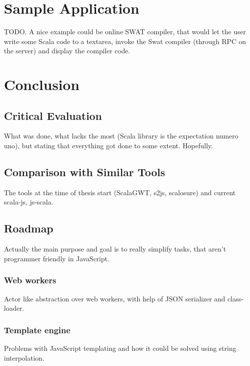 \documentclass[12pt,a4paper]{report}
\begin{document}
\chapter{Sample Application}

TODO. A nice example could be online SWAT compiler, that would let the user write some Scala code to a textarea, invoke the Swat compiler (through RPC on the server) and display the compiler code.



\chapter{Conclusion}

\section{Critical Evaluation}

What was done, what lacks the most (Scala library is the expectation numero uno), but stating that everything got done to some extent. Hopefully.

\section{Comparison with Similar Tools}

The tools at the time of thesis start (ScalaGWT, s2js, scalosure) and current scala-js, js-scala.

\section{Roadmap}

Actually the main purpose and goal is to really simplify tasks, that aren't programmer friendly in JavaScript.

\subsection{Web workers}

Actor like abstraction over web workers, with help of JSON serializer and class-loader.

\subsection{Template engine}

Problems with JavaScript templating and how it could be solved using string interpolation.
\end{document}
